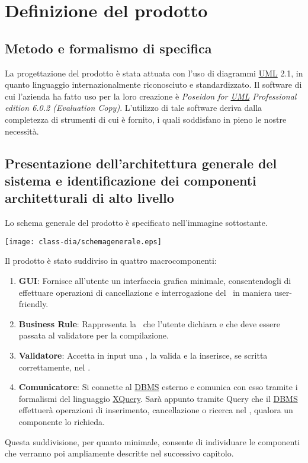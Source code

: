 \chapter{Definizione del prodotto}
\section{Metodo e formalismo di specifica}
La progettazione del prodotto \`e stata attuata con l'uso di diagrammi \underline{UML} 2.1, in quanto linguaggio internazionalmente riconosciuto e standardizzato.
Il software di cui l'azienda ha fatto uso per la loro creazione \`e \textit{Poseidon for \underline{UML} Professional edition 6.0.2 (Evaluation Copy)}. L'utilizzo di tale software deriva dalla completezza
di strumenti di cui \`e fornito, i quali soddisfano in pieno le nostre necessit\`a.

\section [Architettura generale del sistema]{Presentazione dell'architettura generale del sistema e identificazione dei componenti architetturali di alto livello}
Lo schema generale del prodotto \`e specificato nell'immagine sottostante.
\begin{center}
\texttt{[image: class-dia/schemagenerale.eps]}
\end{center}
Il prodotto \`e stato suddiviso in quattro macrocomponenti:
\begin{enumerate}
 \item \textbf{GUI}: Fornisce all'utente un interfaccia grafica minimale, consentendogli di effettuare operazioni di cancellazione e interrogazione del \re\ in maniera user-friendly.
\item \textbf{Business Rule}: Rappresenta la \br\ che l'utente dichiara e che deve essere passata al validatore per la compilazione.
\item \textbf{Validatore}: Accetta in input una \br, la valida e la inserisce, se scritta correttamente, nel \rp.
\item \textbf{Comunicatore}: Si connette al \underline{DBMS} esterno e comunica con esso tramite i formalismi del linguaggio \underline{XQuery}.
Sar\`a appunto tramite Query che il \underline{DBMS} effettuer\`a operazioni di inserimento, cancellazione o ricerca nel \rp, qualora un componente lo richieda.
\end{enumerate}
Questa suddivisione, per quanto minimale, consente di individuare le componenti che verranno poi ampliamente descritte nel successivo capitolo.

